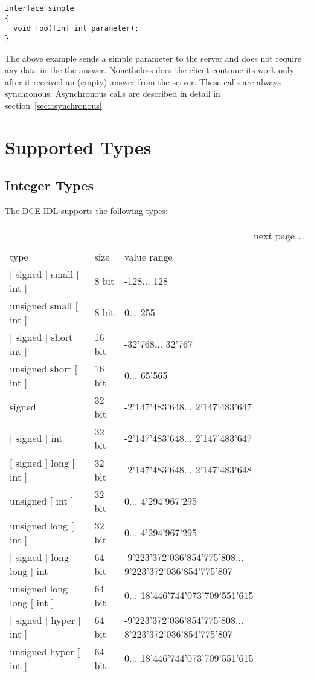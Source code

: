 \begin{verbatim}
interface simple
{
  void foo([in] int parameter);
}
\end{verbatim}

The above example sends a simple parameter to the server and
does not require any data in the the answer. Nonetheless does
the client continue its work only after it received an (empty) 
answer from the server. These calls are always synchronous.
Asynchronous calls are described in detail in section~\ref{sec:asynchronous}.

\section{Supported Types}

\subsection{Integer Types}
The DCE IDL supports the following types:

\begin{center}
\begin{longtable}{|l|l|p{6cm}|}%
  \multicolumn{3}{r}{next page \dots}\\\endfoot%
  \multicolumn{3}{l}{\dots continued from last page}\\\endhead%
  \endfirsthead%
  \endlastfoot%
  \hline
type & size & value range \\ \hline
$[$ signed $]$ small $[$ int $]$ & 8 bit & -128... 128 \\
unsigned small $[$ int $]$ & 8 bit & 0... 255 \\ 
$[$ signed $]$ short $[$ int $]$ & 16 bit & -32'768... 32'767 \\
unsigned short $[$ int $]$ & 16 bit & 0... 65'565 \\
signed & 32 bit & -2'147'483'648... 2'147'483'647 \\
$[$ signed $]$ int & 32 bit & -2'147'483'648... 2'147'483'647 \\
$[$ signed $]$ long $[$ int $]$ & 32 bit & -2'147'483'648... 2'147'483'648 \\
unsigned $[$ int $]$ & 32 bit & 0... 4'294'967'295 \\
unsigned long $[$ int $]$ & 32 bit & 0... 4'294'967'295 \\
$[$ signed $]$ long long $[$ int $]$ & 64 bit & -9'223'372'036'854'775'808... 9'223'372'036'854'775'807 \\
unsigned long long $[$ int $]$ & 64 bit & 0... 18'446'744'073'709'551'615 \\
$[$ signed $]$ hyper $[$ int $]$ & 64 bit & -9'223'372'036'854'775'808... 8'223'372'036'854'775'807 \\
unsigned hyper $[$ int $]$ & 64 bit & 0... 18'446'744'073'709'551'615 \\
\hline
\end{longtable}
\end{center}


